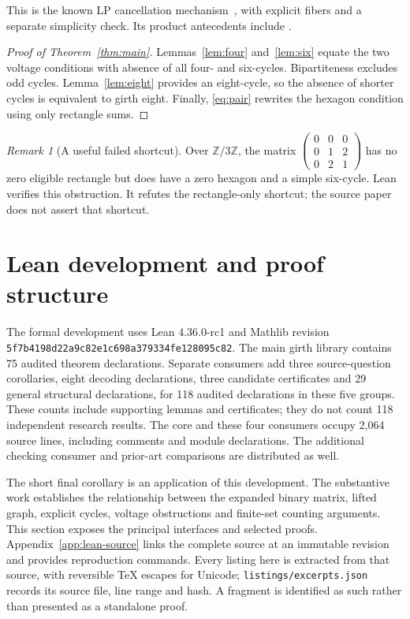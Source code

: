 \documentclass[11pt]{article}
\theoremstyle{definition}
\theoremstyle{remark}
\newtheorem{remark}[theorem]{Remark}
\begin{document}
This is the known LP cancellation mechanism~\cite{RDV2025}, with explicit
fibers and a separate simplicity check. Its product antecedents include
\cite{RV2021,Zhang2024}.

\begin{proof}[Proof of Theorem~\ref{thm:main}]
Lemmas~\ref{lem:four} and~\ref{lem:six} equate the two voltage conditions
with absence of all four- and six-cycles. Bipartiteness excludes odd
cycles. Lemma~\ref{lem:eight} provides an eight-cycle, so the absence of
shorter cycles is equivalent to girth eight. Finally,
\eqref{eq:pair} rewrites the hexagon condition using only rectangle sums.
\end{proof}

\begin{remark}[A useful failed shortcut]
Over $\mathbb Z/3\mathbb Z$, the matrix
$\left(\begin{smallmatrix}0&0&0\\0&1&2\\0&2&1\end{smallmatrix}\right)$
has no zero eligible rectangle but does have a zero hexagon and a simple
six-cycle. Lean verifies this obstruction. It refutes the rectangle-only
shortcut; the source paper does not assert that shortcut.
\end{remark}

\section{Lean development and proof structure}\label{sec:lean}

The formal development uses Lean 4.36.0-rc1 and Mathlib revision
\nolinkurl{5f7b4198d22a9c82e1c698a379334fe128095c82}. The main girth
library contains 75 audited theorem declarations. Separate consumers add
three source-question corollaries, eight decoding declarations, three
candidate certificates and 29 general structural declarations, for 118
audited declarations in these five groups. These counts include supporting
lemmas and certificates; they do not count 118 independent research results.
The core and these four consumers occupy 2,064 source lines, including
comments and module declarations. The additional checking consumer and
prior-art comparisons are distributed as well.

The short final corollary is an application of this development. The
substantive work establishes the relationship between the expanded binary
matrix, lifted graph, explicit cycles, voltage obstructions and finite-set
counting arguments. This section exposes the principal interfaces and
selected proofs. Appendix~\ref{app:lean-source} links the complete source
at an immutable revision and provides reproduction commands. Every listing
here is extracted from that source, with reversible TeX escapes for Unicode;
\texttt{listings/excerpts.json} records its source file, line range and hash.
A fragment is identified as such rather than presented as a standalone proof.
\end{document}
